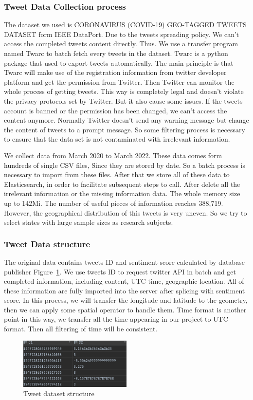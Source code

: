 \subsubsection{Tweet Data Collection process}
The dataset we used is CORONAVIRUS (COVID-19) GEO-TAGGED TWEETS DATASET form
IEEE DataPort. Due to the tweets spreading policy. We can't access the
completed tweets content directly.  Thus. We use a transfer program named
Twarc to batch fetch every tweets in the dataset. Twarc is a python package
that used to export tweets automatically.  The main principle is that Twarc
will make use of the registration information from twitter developer platform
and get the permission from Twitter. Then Twitter can monitor the whole
process of getting tweets. This way is completely legal and doesn't violate
the privacy protocols set by Twitter. But it also cause some issues. If the
tweets account is banned or the permission has been changed, we can't access
the content anymore. Normally Twitter doesn't send any warning message but
change the content of tweets to a prompt message. So some filtering process
is necessary to ensure that the data set is not contaminated with irrelevant
information. 

We collect data from March 2020 to March 2022. These data comes form hundreds
of single CSV files, Since they are stored by date. So a batch process is
necessary to import from these files. After that we store all of these data
to Elasticsearch, in order to facilitate subsequent steps to call. After
delete all the irrelevant information or the missing information data. The
whole memory size up to 142Mi. The number of useful pieces of information
reaches 388,719. However, the geographical distribution of this tweets is
very uneven. So we try to select states with large sample sizes as research
subjects. 

\subsubsection{Tweet Data structure}
The original data contains tweets ID and sentiment score calculated by
database publisher Figure~\ref{fig:Tweet dataset}. We use tweets ID to
request twitter API in batch and get completed information, including
content, UTC time, geographic location. All of these information are fully
imported into the server after splicing with sentiment score.  In this
process, we will transfer the longitude and latitude to the geometry, then we
can apply some spatial operator to handle them. Time format is another point
in this way, we transfer all the time appearing in our project to UTC format.
Then all filtering of time will be consistent. 
\begin{figure}[h]
\centering
\includegraphics[width=0.5\textwidth]{imgs/row_tweets.png}
\caption{Tweet dataset structure}
\label{fig:Tweet dataset}
\end{figure}
